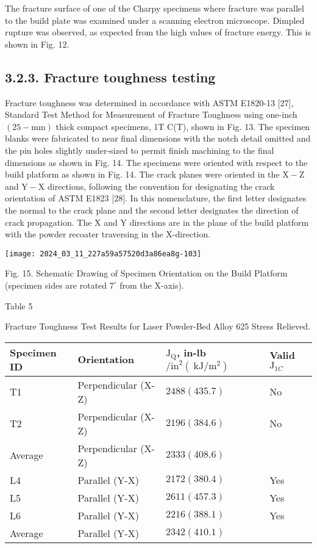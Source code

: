 \documentclass[10pt]{article}
\begin{document}
The fracture surface of one of the Charpy specimens where fracture was parallel to the build plate was examined under a scanning electron microscope. Dimpled rupture was observed, as expected from the high values of fracture energy. This is shown in Fig. 12.

\subsection*{3.2.3. Fracture toughness testing}
Fracture toughness was determined in accordance with ASTM E1820-13 [27], Standard Test Method for Measurement of Fracture Toughness using one-inch $(25-\mathrm{mm})$ thick compact specimens, 1T C(T), shown in Fig. 13. The specimen blanks were fabricated to near final dimensions with the notch detail omitted and the pin holes slightly under-sized to permit finish machining to the final dimensions as shown in Fig. 14. The specimens were oriented with respect to the build platform as shown in Fig. 14. The crack planes were oriented in the $\mathrm{X}-\mathrm{Z}$ and $\mathrm{Y}-\mathrm{X}$ directions, following the convention for designating the crack orientation of ASTM E1823 [28]. In this nomenclature, the first letter designates the normal to the crack plane and the second letter designates the direction of crack propagation. The $\mathrm{X}$ and $\mathrm{Y}$ directions are in the plane of the build platform with the powder recoater traversing in the X-direction.

\begin{center}
\texttt{[image: 2024\_03\_11\_227a59a57520d3a86ea8g-103]}
\end{center}

Fig. 15. Schematic Drawing of Specimen Orientation on the Build Platform (specimen sides are rotated $7^{\circ}$ from the $\mathrm{X}$-axis).

Table 5

Fracture Toughness Test Results for Laser Powder-Bed Alloy 625 Stress Relieved.

\begin{center}
\begin{tabular}{llll}
\hline
Specimen ID & Orientation & $\mathrm{J}_{\mathrm{Q}}$, in-lb $/ \mathrm{in}^{2}\left(\mathrm{~kJ} / \mathrm{m}^{2}\right)$ & Valid $\mathrm{J}_{1 C}$ \\
\hline
T1 & Perpendicular (X-Z) & $2488(435.7)$ & No \\
T2 & Perpendicular (X-Z) & $2196(384.6)$ & No \\
Average & Perpendicular (X-Z) & $2333(408.6)$ &  \\
L4 & Parallel (Y-X) & $2172(380.4)$ & Yes \\
L5 & Parallel (Y-X) & $2611(457.3)$ & Yes \\
L6 & Parallel (Y-X) & $2216(388.1)$ & Yes \\
Average & Parallel (Y-X) & $2342(410.1)$ &  \\
\hline
\end{tabular}
\end{center}
\end{document}
